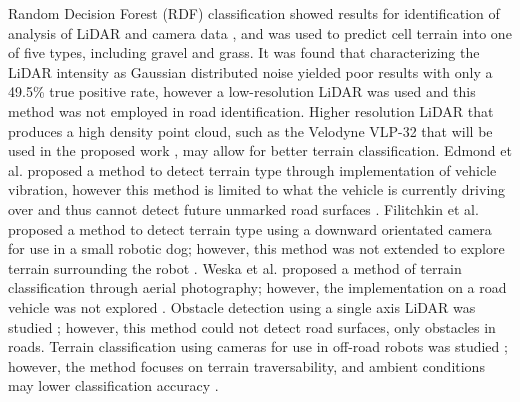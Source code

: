 \documentclass[journal,onecolumn]{IEEEtran}
\begin{document}
	{Random Decision Forest (RDF) classification showed results for identification of analysis of LiDAR and camera data \cite{breiman_random_2001}, and was used to predict cell terrain into one of five types, including gravel and grass. It was found that characterizing the LiDAR intensity as Gaussian distributed noise yielded poor results with only a 49.5\% true positive rate, however a low-resolution LiDAR was used \cite{rauscher_comparison_2016} and this method was not employed in road identification. Higher resolution LiDAR that produces a high density point cloud, such as the Velodyne VLP-32 that will be used in the proposed work \cite{vlp_32c}, may allow for better terrain classification. Edmond et al. proposed a method to detect terrain type through implementation of vehicle vibration, however this method is limited to what the vehicle is currently driving over and thus cannot detect future unmarked road surfaces \cite{dupont_online_2008}. Filitchkin et al. proposed a method to detect terrain type using a downward orientated camera for use in a small robotic dog; however, this method was not extended to explore terrain surrounding the robot \cite{filitchkin_feature_based_2012}. Weska et al. proposed a method of terrain classification through aerial photography; however, the implementation on a road vehicle was not explored \cite{weszka_comparative_1976}. Obstacle detection using a single axis LiDAR was studied \cite{manduchi_obstacle_2005}; however, this method could not detect road surfaces, only obstacles in roads. Terrain classification using cameras for use in off-road robots was studied \cite{walch_offroad_2022}; however, the method focuses on terrain traversability, and ambient conditions may lower classification accuracy \cite{levi_3d_2012_light}. }
\end{document}

